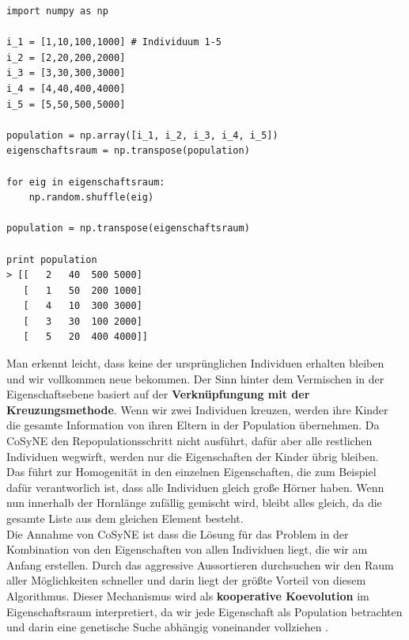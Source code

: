             \begin{mdframed}
            \begin{verbatim}
import numpy as np

i_1 = [1,10,100,1000] # Individuum 1-5
i_2 = [2,20,200,2000]
i_3 = [3,30,300,3000]
i_4 = [4,40,400,4000]
i_5 = [5,50,500,5000]

population = np.array([i_1, i_2, i_3, i_4, i_5])
eigenschaftsraum = np.transpose(population)
  
for eig in eigenschaftsraum:
    np.random.shuffle(eig)

population = np.transpose(eigenschaftsraum)

print population
> [[   2   40  500 5000]
   [   1   50  200 1000]
   [   4   10  300 3000]
   [   3   30  100 2000]
   [   5   20  400 4000]]

            \end{verbatim}
            \end{mdframed}
            \noindent
            Man erkennt leicht, dass keine der ursprünglichen Individuen erhalten bleiben und wir vollkommen neue bekommen. Der Sinn hinter dem Vermischen in der Eigenschaftsebene basiert auf der \textbf{Verknüpfungung mit der Kreuzungsmethode}. Wenn wir zwei Individuen kreuzen, werden ihre Kinder die gesamte Information von ihren Eltern in der Population übernehmen. Da CoSyNE den Repopulationsschritt nicht ausführt, dafür aber alle restlichen Individuen wegwirft, werden nur die Eigenschaften der Kinder übrig bleiben.\\

            \noindent
            Das führt zur Homogenität in den einzelnen Eigenschaften, die zum Beispiel dafür verantworlich ist, dass alle Individuen gleich große Hörner haben. Wenn nun innerhalb der Hornlänge zufällig gemischt wird, bleibt alles gleich, da die gesamte Liste aus dem gleichen Element besteht. \\

            \noindent
            Die Annahme von CoSyNE ist dass die Lösung für das Problem in der Kombination von den Eigenschaften von allen Individuen liegt, die wir am Anfang erstellen. Durch das aggressive Aussortieren durchsuchen wir den Raum aller Möglichkeiten schneller und darin liegt der größte Vorteil von diesem Algorithmus. Dieser Mechanismus wird als \textbf{kooperative Koevolution} im Eigenschaftsraum interpretiert, da wir jede Eigenschaft als Population betrachten und darin eine genetische Suche abhängig voneinander vollziehen \cite{cosyne2}. \\


